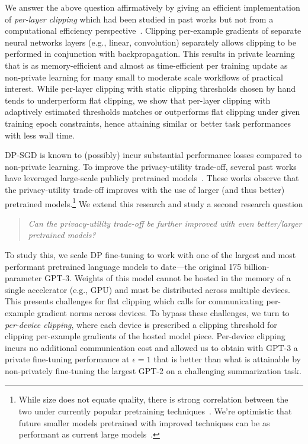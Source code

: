 We answer the above question affirmatively by giving an efficient implementation of \emph{per-layer clipping} which had been studied in past works but not from a computational efficiency perspective~\citep{mcmahan2018learning,dupuy2022efficient}. 
Clipping per-example gradients of separate neural networks layers (e.g., linear, convolution) separately allows clipping to be performed in conjunction with backpropagation. 
This results in private learning that is as memory-efficient and almost as time-efficient per training update as non-private learning for many small to moderate scale workflows of practical interest. 
While per-layer clipping with static clipping thresholds chosen by hand tends to underperform flat clipping, we show that per-layer clipping with adaptively estimated thresholds matches or outperforms flat clipping under given training epoch constraints, hence attaining similar or better task performances with less wall time.


DP-SGD is known to (possibly) incur substantial performance losses compared to non-private learning.
To improve the privacy-utility trade-off, several past works have leveraged large-scale publicly pretrained models~\citep{yu2022differentially,li2022large,de2022unlocking,mehta2022large}.
These works observe that the privacy-utility trade-off improves with the use of larger (and thus better) pretrained models.\footnote{While size does not equate quality, there is strong correlation between the two under currently popular pretraining techniques~\citep{liu2019roberta,brown2020language}. We're optimistic that future smaller models pretrained with improved techniques can be as performant as current large models~\citep{hoffmann2022training}. 
}
We extend this research and study a second research question 
\begin{quote}
	\centering
	\emph{\footnotesize Can the privacy-utility trade-off be further improved with even better/larger pretrained models?}
\end{quote}
To study this, we scale DP fine-tuning to work with one of the largest and most performant pretrained language models to date---the original 175 billion-parameter GPT-3.
Weights of this model cannot be hosted in the memory of a single accelerator (e.g., GPU) and must be distributed across multiple devices. 
This presents challenges for flat clipping which calls for communicating per-example gradient norms across devices. To bypass these challenges, we turn to \emph{per-device clipping}, where each device is prescribed a clipping threshold for clipping per-example gradients of the hosted model piece.
Per-device clipping incurs no additional communication cost and allowed us to obtain with GPT-3 a private fine-tuning performance at $\epsilon=1$ that is better than what is attainable by non-privately fine-tuning the largest GPT-2 on a challenging summarization task. 


